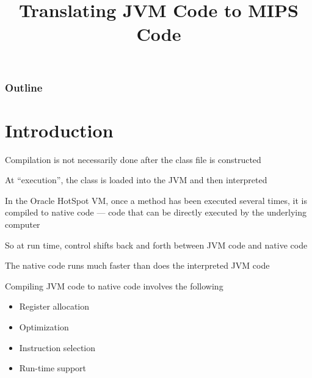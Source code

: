 \documentclass[8pt,a4paper,compress,handout]{beamer}
\title{Translating JVM Code to MIPS Code}
\date{}
\begin{document}
\begin{frame}
\vfill
\titlepage
\end{frame}

\begin{frame}
\frametitle{Outline}
\tableofcontents
\end{frame}

\section{Introduction}
\begin{frame}[fragile]
\pause

Compilation is not necessarily done after the class file is constructed

\pause
\bigskip

At ``execution'', the class is loaded into the JVM and then interpreted

\pause
\bigskip

In the Oracle HotSpot VM, once a method has been executed several times, it is compiled to native code --- code that can be directly executed by the underlying computer

\pause
\bigskip

So at run time, control shifts back and forth between JVM code and native code

\pause
\bigskip

The native code runs much faster than does the interpreted JVM code

\pause
\bigskip

Compiling JVM code to native code involves the following
\begin{itemize}
\item Register allocation
\item Optimization
\item Instruction selection
\item Run-time support
\end{itemize}
\end{frame}
\end{document}
